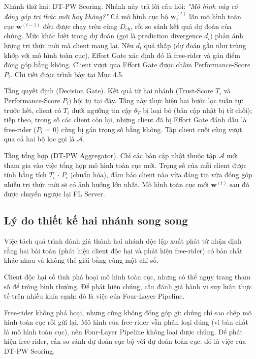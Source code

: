Nhánh thứ hai: DT-PW Scoring. Nhánh này trả lời câu hỏi: \emph{"Mô hình này có đóng góp tri thức mới hay không?"} Cả mô hình cục bộ $\mathbf{w}_{i}^{(t)}$ lẫn mô hình toàn cục $\mathbf{w}^{(t-1)}$ đều được chạy trên cùng $D_{\text{ch}}$, rồi so sánh kết quả dự đoán của chúng. Mức khác biệt trong dự đoán (gọi là prediction divergence $d_{i})$ phản ánh lượng tri thức mới mà client mang lại. Nếu $d_{i}$ quá thấp (dự đoán gần như trùng khớp với mô hình toàn cục), Effort Gate xác định đó là free-rider và gán điểm đóng góp bằng không. Client vượt qua Effort Gate được chấm Performance-Score $P_{i}$. Chi tiết được trình bày tại Mục 4.5.

Tầng quyết định (Decision Gate). Kết quả từ hai nhánh (Trust-Score $T_{i}$ và Performance-Score $P_{i})$ hội tụ tại đây. Tầng này thực hiện hai bước lọc tuần tự: trước hết, client có $T_{i}$ dưới ngưỡng tin cậy $\theta_{T}$ bị loại bỏ (bản cập nhật bị từ chối); tiếp theo, trong số các client còn lại, những client đã bị Effort Gate đánh dấu là free-rider ($P_{i}$ = 0) cũng bị gán trọng số bằng không. Tập client cuối cùng vượt qua cả hai bộ lọc gọi là $\mathcal{A}$.

Tầng tổng hợp (DT-PW Aggregator). Chỉ các bản cập nhật thuộc tập $\mathcal{A}$ mới tham gia vào việc tổng hợp mô hình toàn cục mới. Trọng số của mỗi client được tính bằng tích $T_{i}$ $\cdot$ $P_{i}$ (chuẩn hóa), đảm bảo client nào vừa đáng tin vừa đóng góp nhiều tri thức mới sẽ có ảnh hưởng lớn nhất. Mô hình toàn cục mới $\mathbf{w}^{(t)}$ sau đó được chuyển ngược lại FL Server.

\subsection{Lý do thiết kế hai nhánh song song}
Việc tách quá trình đánh giá thành hai nhánh độc lập xuất phát từ nhận định rằng hai bài toán (phát hiện client độc hại và phát hiện free-rider) có bản chất khác nhau và không thể giải bằng cùng một chỉ số.

Client độc hại cố tình phá hoại mô hình toàn cục, nhưng có thể ngụy trang tham số để trông bình thường. Để phát hiện chúng, cần đánh giá hành vi suy luận thực tế trên nhiều khía cạnh: đó là việc của Four-Layer Pipeline.

Free-rider không phá hoại, nhưng cũng không đóng góp gì: chúng chỉ sao chép mô hình toàn cục rồi gửi lại. Mô hình của free-rider vẫn phân loại đúng (vì bản chất là mô hình toàn cục), nên Four-Layer Pipeline không loại được chúng. Để phát hiện free-rider, cần so sánh dự đoán cục bộ với dự đoán toàn cục: đó là việc của DT-PW Scoring.

